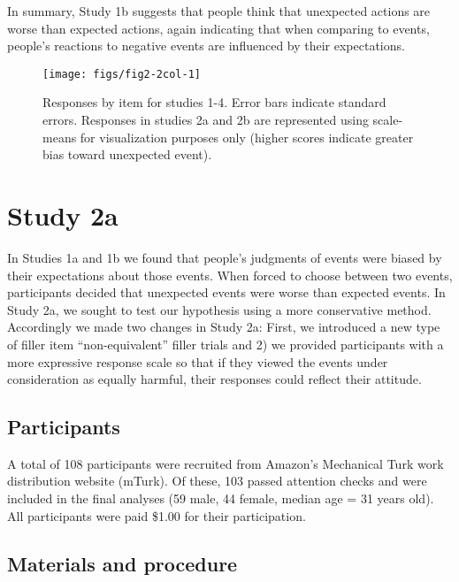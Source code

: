 \documentclass[10pt, letterpaper]{article}
\newenvironment{CodeChunk}{}{}
\begin{document}
In summary, Study 1b suggests that people think that unexpected actions
are worse than expected actions, again indicating that when comparing to
events, people's reactions to negative events are influenced by their
expectations.

\begin{CodeChunk}
\begin{figure*}[h]

{\centering \texttt{[image: figs/fig2-2col-1]} 

}

\caption[Responses by item for studies 1-4]{Responses by item for studies 1-4. Error bars indicate standard errors. Responses in studies 2a and 2b are represented using scale-means for visualization purposes only (higher scores indicate greater bias toward unexpected event).}\label{fig:fig2-2col}
\end{figure*}
\end{CodeChunk}

\section{Study 2a}\label{study-2a}

In Studies 1a and 1b we found that people's judgments of events were
biased by their expectations about those events. When forced to choose
between two events, participants decided that unexpected events were
worse than expected events. In Study 2a, we sought to test our
hypothesis using a more conservative method. Accordingly we made two
changes in Study 2a: First, we introduced a new type of filler item
``non-equivalent'' filler trials and 2) we provided participants with a
more expressive response scale so that if they viewed the events under
consideration as equally harmful, their responses could reflect their
attitude.

\subsection{Participants}\label{participants-2}

A total of 108 participants were recruited from Amazon's Mechanical Turk
work distribution website (mTurk). Of these, 103 passed attention checks
and were included in the final analyses (59 male, 44 female, median age
= 31 years old). All participants were paid \$1.00 for their
participation.

\subsection{Materials and procedure}\label{materials-and-procedure-2}
\end{document}
